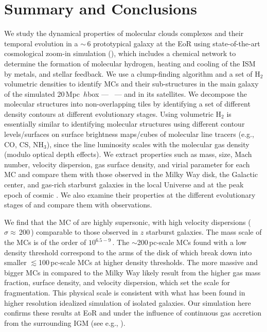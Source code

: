 \IfFileExists{emulateapjlegacy.cls}{\documentclass[iop]{emulateapjlegacy}}{\documentclass[iop]{emulateapj}}
\begin{document}
\section{Summary and Conclusions}      \label{sec:conclusion}

We study the dynamical properties of molecular clouds complexes and their temporal evolution in a \z$\sim$\,6 prototypical galaxy
at the EoR using state-of-the-art cosmological zoom-in simulation (),
which includes a chemical network to determine the formation of molecular
hydrogen, heating and cooling of the ISM by metals, and stellar feedback.
We use a clump-finding algorithm and a set of H$_2$ volumetric densities
to identify MCs and their sub-structures in the main galaxy of the
simulated 20\,Mpc~$h$\pmOne box --- \flower\ --- and in its satellites.
We decompose the molecular structures into non-overlapping tiles
by identifying a set of different density contours at different evolutionary stages.
Using volumetric H$_2$ is essentially similar to identifying molecular structures using
different contour levels/surfaces on surface brightness maps/cubes of molecular line tracers (e.g., CO, CS, NH$_3$),
since the line luminosity scales with the molecular gas density (modulo optical depth effects).
We extract properties such as mass, size, Mach number, velocity dispersion, gas surface density, and virial parameter for each MC and
compare them with those observed in the Milky Way disk, the Galactic center,
and gas-rich starburst galaxies in the local Universe and at the peak epoch of cosmic \SF.
We also examine their properties at the different evolutionary stages of \flower and compare
them with observations.

We find that the MC of \flower are highly supersonic, with high velocity dispersions ($\sigma\approx$\,200\,\kms) comparable to
those observed in $z$ starburst galaxies.
The mass scale of the MCs is of the order of $10^{6.5-9}$\,\Msun. The $\sim$200\,pc-scale MCs found with a low density threshold
correspond to the arms of the disk of \flower which break down into smaller $\lesssim$100\,pc-scale MCs at higher density thresholds.
The more massive and bigger MCs in \flower compared to the Milky Way
likely result from the higher gas mass fraction, surface density, and velocity dispersion,
which set the scale for fragmentation.
This physical scale is
consistent with what has been found in higher resolution idealized simulation of isolated galaxies.
Our simulation here confirms these results at EoR and under
the influence of continuous gas accretion from the surrounding IGM (see e.g., \citealt{Klessen10a, Goldbaum11a}).
\end{document}
